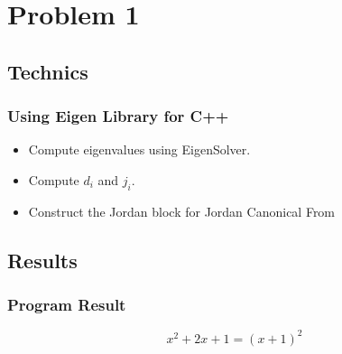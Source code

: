 \section{Problem 1}
\subsection{Technics}

    \begin{frame}
        \frametitle{Using Eigen Library for C++}

        \begin{itemize}
            \item Compute eigenvalues using EigenSolver.
            \item Compute \(d_i\) and \(j_i\).
            \item Construct the Jordan block for Jordan Canonical From
        \end{itemize}

    \end{frame}

    \subsection{Results}
    \begin{frame}
        \frametitle{Program Result}
        
        \begin{equation}
            x^2+2x+1=(x+1)^2
        \end{equation}
        
    \end{frame}